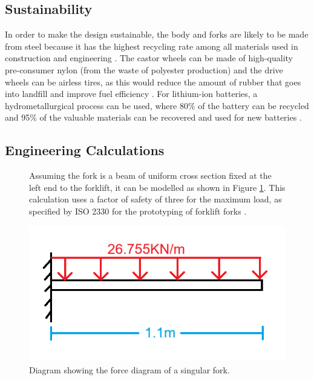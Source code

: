 \documentclass[12pt,titlepage]{article}
\begin{document}
\subsection{Sustainability}
In order to make the design sustainable, the body and forks are likely to be made from steel because it has the highest recycling rate among all materials used in construction and engineering \cite{baker2023}. The castor wheels can be made of high-quality pre-consumer nylon (from the waste of polyester production) \cite{eco2022} and the drive wheels can be airless tires, as this would reduce the amount of rubber that goes into landfill and improve fuel efficiency \cite{ImperialTyres}. For lithium-ion batteries, a hydrometallurgical process can be used, where 80\% of the battery can be recycled and 95\% of the valuable materials can be recovered and used for new batteries \cite{Lithium-ion}.

\subsection {Engineering Calculations}
\vspace{-8pt}
\begin{figure}[H]
    \centering
    \begin{minipage}[t]{0.5\textwidth}
        \vspace{0pt}
        \linespread{1.5}
        Assuming the fork is a beam of uniform cross section fixed at the left end to the forklift, it can be modelled as shown in Figure \ref{fig:x}. This calculation uses a factor of safety of three for the maximum load, as specified by ISO 2330 for the prototyping of forklift forks \cite{iso2330}.
    \end{minipage}%
    \hfill
    \begin{minipage}[t]{0.45\textwidth}
        \vspace{-32pt} 
        \centering
        \includegraphics[width=\linewidth]{fork as a beam diagram.png}
        \vspace{-40pt}
        \caption{Diagram showing the force diagram of a singular fork.}
        \label{fig:x}
    \end{minipage}
\end{figure}
\end{document}
